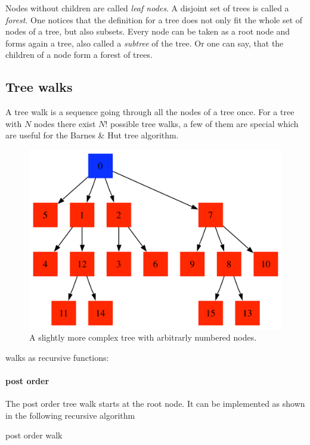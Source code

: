 Nodes without children are called \emph{leaf nodes}. A disjoint set of trees is called a \emph{forest}. One notices that the definition for a tree does not only fit the whole set of nodes of a tree, but also subsets. Every node can be taken as a root node and forms again a tree, also called a \emph{subtree} of the tree. Or one can say, that the children of a node form a forest of trees.

\subsection{Tree walks}
A tree walk is a sequence going through all the nodes of a tree once. For a tree with $N$ nodes there exist $N!$ possible tree walks, a few of them are special which are useful for the Barnes \& Hut tree algorithm.

\begin{figure}[htbp]
\begin{center}
\includegraphics[scale=0.4]{simple_numbered_tree.pdf}
\caption{A slightly more complex tree with arbitrarly numbered nodes.}
\label{fig:simplenumtree}
\end{center}
\end{figure}

walks as recursive functions:

\paragraph{post order}
The post order tree walk starts at the root node. It can be implemented as shown in the following recursive algorithm
\begin{algorithm}
\caption{post order walk}
\begin{algorithmic}
\label{alg:postorder}
\ENDFOR
\end{algorithmic}
\end{algorithm}
\\

